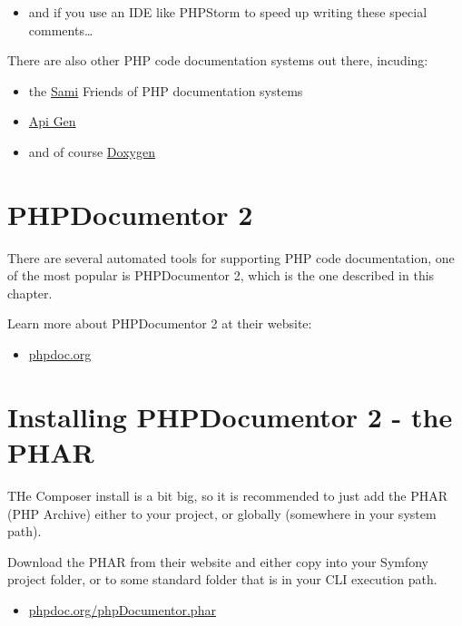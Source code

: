 \documentclass[a4paperpaper,openright]{book}
\providecommand{\tightlist}{%
  \setlength{\itemsep}{0pt}\setlength{\parskip}{0pt}}
\begin{document}
\begin{itemize}
\tightlist
\item
  and if you use an IDE like PHPStorm to speed up writing these special
  comments\ldots{}
\end{itemize}

There are also other PHP code documentation systems out there, incuding:

\begin{itemize}
\item
  the \href{https://github.com/FriendsOfPHP/sami}{Sami} Friends of PHP
  documentation systems
\item
  \href{https://github.com/ApiGen/ApiGen}{Api Gen}
\item
  and of course \href{http://www.stack.nl/~dimitri/doxygen/}{Doxygen}
\end{itemize}

\hypertarget{phpdocumentor-2}{%
\section{PHPDocumentor 2}\label{phpdocumentor-2}}

There are several automated tools for supporting PHP code documentation,
one of the most popular is PHPDocumentor 2, which is the one described
in this chapter.

Learn more about PHPDocumentor 2 at their website:

\begin{itemize}
\tightlist
\item
  \href{https://www.phpdoc.org/}{phpdoc.org}
\end{itemize}

\hypertarget{installing-phpdocumentor-2---the-phar}{%
\section{Installing PHPDocumentor 2 - the
PHAR}\label{installing-phpdocumentor-2---the-phar}}

THe Composer install is a bit big, so it is recommended to just add the
PHAR (PHP Archive) either to your project, or globally (somewhere in
your system path).

Download the PHAR from their website and either copy into your Symfony
project folder, or to some standard folder that is in your CLI execution
path.

\begin{itemize}
\tightlist
\item
  \href{https://www.phpdoc.org/phpDocumentor.phar}{phpdoc.org/phpDocumentor.phar}
\end{itemize}
\end{document}
